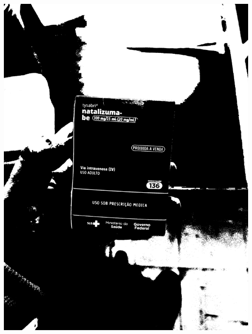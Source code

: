 \begin{frame}
\begin{columns}
\begin{column}{0.24\textwidth}
			\includegraphics[height=0.35\textheight]{../pictures/tysabri_b_thresh_recomposed_cmyk.jpg}
			\\\vspace{\floatsep}

\end{column}
\end{columns}
\end{frame}

